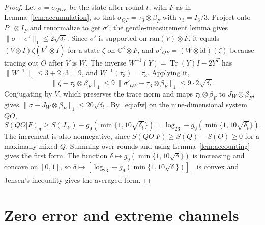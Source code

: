 \documentclass[11pt]{article}
\theoremstyle{definition}
\theoremstyle{remark}
\newcommand{\Tr}{\operatorname{Tr}}
\begin{document}
\begin{proof}
Let $\sigma=\sigma_{QOF}$ be the state after round $t$, with $F$ as in Lemma~\ref{lem:accumulation}, so that $\sigma_{QF}=\tau_3\otimes\beta_F$ with $\tau_3=I_3/3$. Project onto $P_-\otimes I_F$ and renormalize to get $\sigma'$; the gentle-measurement lemma gives $\|\sigma-\sigma'\|_1\le2\sqrt{\delta_t}$. Since $\sigma'$ is supported on $\mathrm{ran}(V)\otimes F$, it equals $(V\otimes I)\zeta(V^*\otimes I)$ for a state $\zeta$ on $\mathbb C^3\otimes F$, and $\sigma'_{QF}=(W\otimes\mathrm{id})(\zeta)$ because tracing out $O$ after $V$ is $W$. The inverse $W^{-1}(Y)=\Tr(Y)I-2Y^T$ has $\|W^{-1}\|_\diamond\le3+2\cdot3=9$, and $W^{-1}(\tau_3)=\tau_3$. Applying it,
\[
\|\zeta-\tau_3\otimes\beta_F\|_1\le9\,\|\sigma'_{QF}-\tau_3\otimes\beta_F\|_1\le9\cdot2\sqrt{\delta_t}.
\]
Conjugating by $V$, which preserves the trace norm and maps $\tau_3\otimes\beta_F$ to $J_W\otimes\beta_F$, gives $\|\sigma-J_W\otimes\beta_F\|_1\le20\sqrt{\delta_t}$. By~\eqref{eq:afw} on the nine-dimensional system $QO$,
\[
S(QO|F)_\sigma\ge S(J_W)-g_9(\min\{1,10\sqrt{\delta_t}\})=\log_23-g_9(\min\{1,10\sqrt{\delta_t}\}).
\] The increment is also nonnegative, since $S(QO|F)\ge S(Q)-S(O)\ge0$ for a maximally mixed $Q$. Summing over rounds and using Lemma~\ref{lem:accounting} gives the first form. The function $\delta\mapsto g_9(\min\{1,10\sqrt\delta\})$ is increasing and concave on $[0,1]$, so $\delta\mapsto[\log_23-g_9(\min\{1,10\sqrt\delta\})]_+$ is convex and Jensen's inequality gives the averaged form.
\end{proof}

\section{Zero error and extreme channels}\label{app:extreme}
\end{document}
